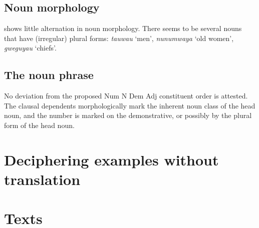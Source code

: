 \documentclass{article}
\newcommand*{\corpus}[1]{\emph{#1}}
\newcommand{\translate}[1]{`#1'}
\begin{document}
\subsection{Noun morphology}

 shows little alternation in noun morphology.
There seems to be several nouns that have (irregular) plural forms:
\corpus{tauwau} \translate{men}, 
\corpus{nunumwaya} \translate{old women},
\corpus{gweguyau} \translate{chiefs}.

\subsection{The noun phrase}

No deviation from the proposed Num N Dem Adj constituent order is attested.
The clausal dependents morphologically mark the inherent noun class of the head noun,
and the number is marked on the demonstrative, or possibly by the plural form of the head noun.

\section{Deciphering examples without translation}


\section{Texts}\label{sec:data}
\end{document}
